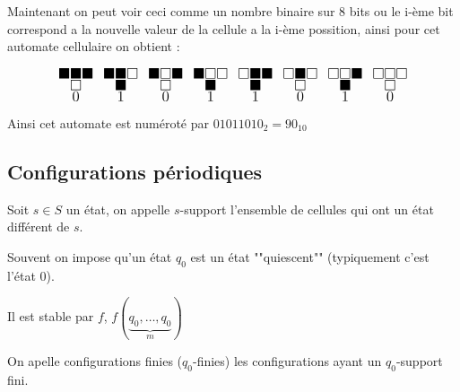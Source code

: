 \begin{notation}
	Maintenant on peut voir ceci comme un nombre binaire sur 8 bits ou le i-ème bit correspond a la
	nouvelle valeur de la cellule a la i-ème possition, ainsi pour cet automate cellulaire on obtient :


	\[ \LARGE
		\substack{\blacksquare \blacksquare \blacksquare \\ \square \\ 0 } \enspace
		\substack{\blacksquare \blacksquare \square \\ \blacksquare \\ 1} \enspace
		\substack{\blacksquare \square \blacksquare \\ \square \\ 0} \enspace
		\substack{\blacksquare \square \square \\ \blacksquare \\ 1} \enspace
		\substack{\square \blacksquare \blacksquare \\ \blacksquare \\ 1} \enspace
		\substack{\square \blacksquare \square \\ \square \\ 0} \enspace
		\substack{\square \square \blacksquare \\ \blacksquare \\ 1} \enspace
		\substack{\square \square \square \\ \square \\ 0}
	\]

	Ainsi cet automate est numéroté par $01011010_2 = 90_{10}$
\end{notation}

\subsection{Configurations périodiques}

\begin{definition}
	Soit $s \in S$ un état, on appelle $s$-support l'ensemble de cellules qui ont
	un état différent de $s$.
\end{definition}

\begin{notation}
	Souvent on impose qu'un état $q_0$ est un état ""quiescent"" (typiquement c'est l'état 0).

	Il est stable par $f$, \ie $f(\underbrace{q_0,\ldots, q_0}_m)$
\end{notation}

\begin{definition}
	On apelle configurations finies ($q_0$-finies) les configurations ayant un $q_0$-support fini.
\end{definition}

